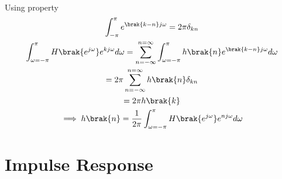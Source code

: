 \documentclass[journal,12pt,twocolumn]{IEEEtran}
\renewcommand\thesection{\arabic{section}}
\begin{document}
\begin{enumerate}[label=\thesection.\arabic*]
\begin{align}
\end{align}
Using property 
\begin{multline}
	\int_{-\pi}^{\pi}e^{\brak{k-n}j\omega}=2\pi\delta_{kn}\\
	\int_{\omega=-\pi}^{\pi}H\brak{e^{j\omega}}e^{kj\omega} d\omega=\sum_{n=-\infty}^{n=\infty}\int_{\omega=-\pi}^{\pi}h\brak{n}e^{\brak{k-n}j\omega}d\omega\\
	=2\pi\sum_{n=-\infty}^{n=\infty}h\brak{n}\delta_{kn}\\
	=2\pi h\brak{k}\\
	\implies h\brak{n}=\frac{1}{2\pi}\int_{\omega=-\pi}^{\pi}H\brak{e^{j\omega}}e^{nj\omega} d\omega
\end{multline}
\end{enumerate}
\section{Impulse Response}
\end{document}
